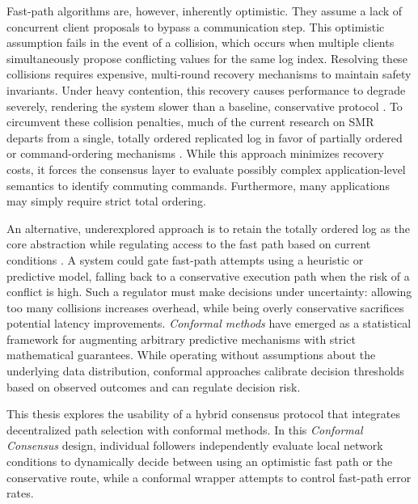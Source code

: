 Fast-path algorithms are, however, inherently optimistic. They assume a lack of concurrent client proposals to bypass a communication step. This optimistic assumption fails in the event of a collision, which occurs when multiple clients simultaneously propose conflicting values for the same log index. Resolving these collisions requires expensive, multi-round recovery mechanisms to maintain safety invariants. Under heavy contention, this recovery causes performance to degrade severely, rendering the system slower than a baseline, conservative protocol \cite{Junqueira-ClassicVsFastPaxos-2007}. To circumvent these collision penalties, much of the current research on \gls{SMR} departs from a single, totally ordered replicated log in favor of partially ordered or command-ordering mechanisms \cite{Ryabinin-SwiftPaxos-2024, Moraru-Epaxos-2013, Park-Curp-2019}. While this approach minimizes recovery costs, it forces the consensus layer to evaluate possibly complex application-level semantics to identify commuting commands. Furthermore, many applications may simply require strict total ordering.

An alternative, underexplored approach is to retain the totally ordered log as the core abstraction while regulating access to the fast path based on current conditions \cite{Junqueira-ClassicVsFastPaxos-2007}. A system could gate fast-path attempts using a heuristic or predictive model, falling back to a conservative execution path when the risk of a conflict is high. Such a regulator must make decisions under uncertainty: allowing too many collisions increases overhead, while being overly conservative sacrifices potential latency improvements. \textit{Conformal methods} \cite{Shafer-ConformalPrediction-2008, Angelopoulus-ConformalPrediction-2023, Angelopoulus-ConformalRiskControl-2025} have emerged as a statistical framework for augmenting arbitrary predictive mechanisms with strict mathematical guarantees. While operating without assumptions about the underlying data distribution, conformal approaches calibrate decision thresholds based on observed outcomes and can regulate decision risk.

This thesis explores the usability of a hybrid consensus protocol that integrates decentralized path selection with conformal methods. In this \textit{Conformal Consensus} design, individual followers independently evaluate local network conditions to dynamically decide between using an optimistic fast path or the conservative route, while a conformal wrapper attempts to control fast-path error rates.

